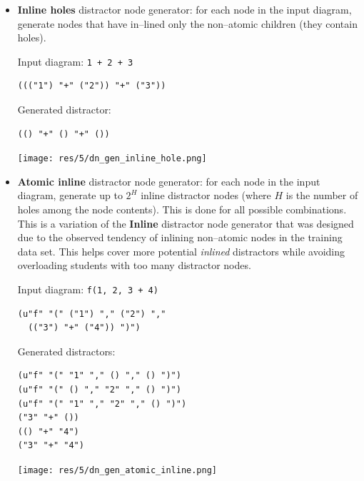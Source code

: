 \begin{chapterBody}
\begin{itemize}
\begin{enumerate}
\end{enumerate}
    \item \textbf{Inline holes} distractor node generator: for each node in
the input diagram, generate nodes that have in–lined only the non–atomic 
children (they contain holes).

\begin{minipage}{.45\linewidth}
Input diagram: \texttt{1 + 2 + 3}
\begin{lstlisting}[language=etl]
((("1") "+" ("2")) "+" ("3"))
\end{lstlisting}
Generated distractor:
\begin{lstlisting}[language=etl]
(() "+" () "+" ())
\end{lstlisting}
\end{minipage}
\hspace{.1\linewidth}
\begin{minipage}{.4\linewidth}
\texttt{[image: res/5/dn\_gen\_inline\_hole.png]}
\end{minipage}

    \item \textbf{Atomic inline} distractor node generator: for each node
in the input diagram, generate up to $ 2^H $ inline distractor nodes (where
$ H $ is the number of holes among the node contents). This is done for all
possible combinations. This is a variation of the \textbf{Inline}
distractor node generator that was designed due to the observed tendency of
inlining non–atomic nodes in the training data set. This helps cover more
potential \textit{inlined} distractors while avoiding overloading students
with too many distractor nodes.

\begin{minipage}{.45\linewidth}
Input diagram: \texttt{f(1, 2, 3 + 4)}
\begin{lstlisting}[language=etl]
(u"f" "(" ("1") "," ("2") ","
  (("3") "+" ("4")) ")")
\end{lstlisting}
Generated distractors:
\begin{lstlisting}[language=etl]
(u"f" "(" "1" "," () "," () ")")
(u"f" "(" () "," "2" "," () ")")
(u"f" "(" "1" "," "2" "," () ")")
("3" "+" ())
(() "+" "4")
("3" "+" "4")
\end{lstlisting}
\end{minipage}
\hspace{.1\linewidth}
\begin{minipage}{.4\linewidth}
\texttt{[image: res/5/dn\_gen\_atomic\_inline.png]}
\end{minipage}


\end{itemize}
\end{chapterBody}
